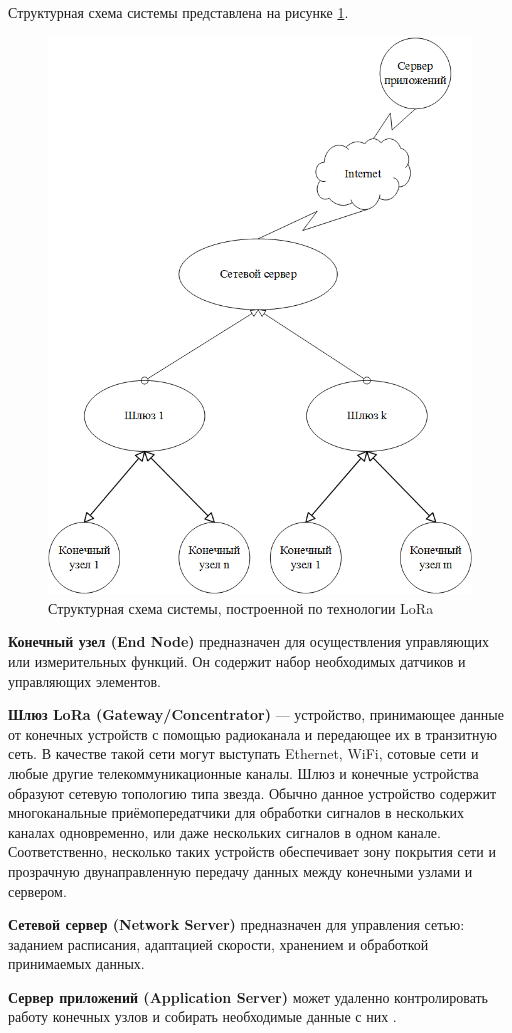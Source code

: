Структурная схема системы представлена на рисунке
\ref{fig:LoRa}.
\begin{figure}[H]
	\centering\includegraphics[width=0.7\linewidth]{img/LoRa}
	\caption{Структурная схема системы, построенной по технологии LoRa}
	\label{fig:LoRa}
\end{figure}


\textbf{Конечный узел (End Node) }предназначен для осуществления управляющих или измерительных функций. Он содержит набор необходимых датчиков и управляющих элементов.

\textbf{Шлюз LoRa (Gateway/Concentrator)} — устройство, принимающее данные от конечных устройств с помощью радиоканала и передающее их в транзитную сеть. В качестве такой сети могут выступать Ethernet, WiFi, сотовые сети и любые другие телекоммуникационные каналы. Шлюз и конечные устройства образуют сетевую топологию типа звезда. Обычно данное устройство содержит многоканальные приёмопередатчики для обработки сигналов в нескольких каналах одновременно, или даже нескольких сигналов в одном канале. Соответственно, несколько таких устройств обеспечивает зону покрытия сети и прозрачную двунаправленную передачу данных между конечными узлами и сервером.

\textbf{Сетевой сервер (Network Server)} предназначен для управления сетью: заданием расписания, адаптацией скорости, хранением и обработкой принимаемых данных.

\textbf{Сервер приложений (Application Server)} может удаленно контролировать работу конечных узлов и собирать необходимые данные с них \cite{1}.

